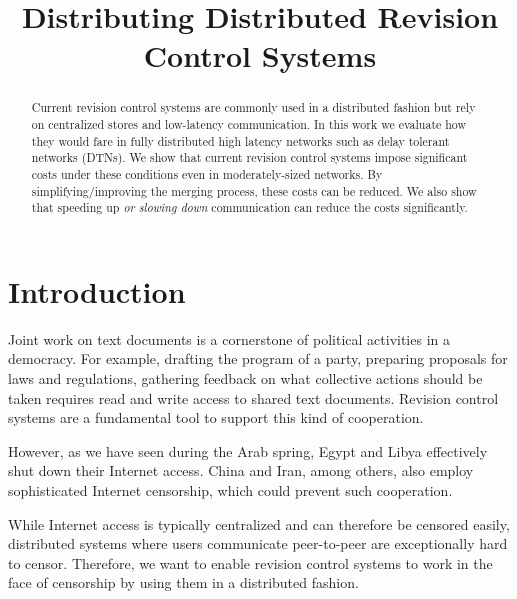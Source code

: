 \documentclass[conference,letterpaper]{IEEEtran}
\begin{document}
\title{Distributing Distributed Revision Control Systems}

\author{
\and
{}
}
\maketitle


\begin{abstract}
\boldmath Current revision control systems are commonly used in a distributed fashion but rely on centralized stores and low-latency communication. In this work we evaluate how they would fare in fully distributed high latency networks such as delay tolerant networks (DTNs). We show that current revision control systems impose significant costs under these conditions even in moderately-sized networks. By simplifying/improving the merging process, these costs can be reduced.
We also show that speeding up \textit{or slowing down} communication can reduce the costs significantly.
\end{abstract}

\IEEEpeerreviewmaketitle

\section{Introduction}

Joint work on text documents is a cornerstone of political activities in a democracy. For example, drafting the program of a party, preparing proposals for laws and regulations, gathering feedback on what collective actions should be taken requires read and write access to shared text documents. Revision control systems are a fundamental tool to support this kind of cooperation.

However, as we have seen during the Arab spring, Egypt and Libya effectively shut down their Internet access\cite{outage}. China and Iran, among others, also employ sophisticated Internet censorship, which could prevent such cooperation.

While Internet access is typically centralized and can therefore be censored easily, distributed systems where users communicate peer-to-peer are exceptionally hard to censor. Therefore, we want to enable revision control systems to work in the face of censorship by using them in a distributed fashion.
\end{document}
